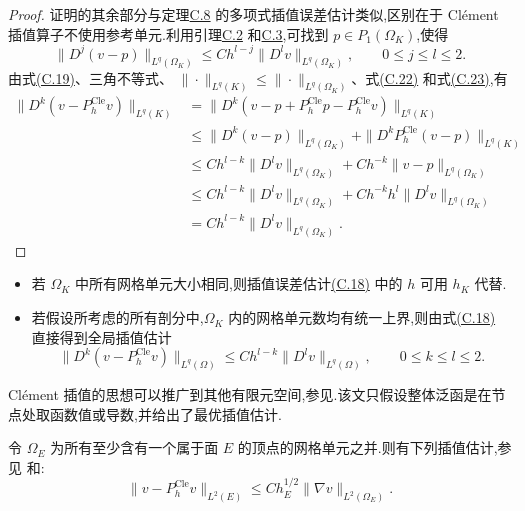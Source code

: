 \begin{proof}
证明的其余部分与定理\hyperref[thm:appendix-c-8]{C.8} 的多项式插值误差估计类似,区别在于 Clément 插值算子不使用参考单元.利用引理\hyperref[lem:appendix-c-2]{C.2} 和\hyperref[lem:appendix-c-3]{C.3},可找到 $p\in P_1(\Omega_K)$,使得
\begin{equation}\label{eq:appendix-c-23}
 \|D^j(v-p)\|_{L^q(\Omega_K)}
 \le Ch^{l-j}\|D^l v\|_{L^q(\Omega_K)},
 \qquad 0\le j\le l\le2.
\end{equation}
由式\hyperref[eq:appendix-c-19]{(C.19)}、三角不等式、
$\|\cdot\|_{L^q(K)}\le\|\cdot\|_{L^q(\Omega_K)}$、式\hyperref[eq:appendix-c-22]{(C.22)} 和式\hyperref[eq:appendix-c-23]{(C.23)},有
\[
\begin{aligned}
 \|D^k(v-P_h^{\mathrm{Cle}}v)\|_{L^q(K)}
 &=\|D^k(v-p+P_h^{\mathrm{Cle}}p-P_h^{\mathrm{Cle}}v)\|_{L^q(K)}\\
 &\le\|D^k(v-p)\|_{L^q(\Omega_K)}
   +\|D^kP_h^{\mathrm{Cle}}(v-p)\|_{L^q(K)}\\
 &\le Ch^{l-k}\|D^lv\|_{L^q(\Omega_K)}
   +Ch^{-k}\|v-p\|_{L^q(\Omega_K)}\\
 &\le Ch^{l-k}\|D^lv\|_{L^q(\Omega_K)}
   +Ch^{-k}h^l\|D^lv\|_{L^q(\Omega_K)}\\
 &=Ch^{l-k}\|D^lv\|_{L^q(\Omega_K)}.
\end{aligned}
\]
\end{proof}

\begin{note}[一致网格]\label{note:appendix-c-19}
\begin{itemize}
 \item 若 $\Omega_K$ 中所有网格单元大小相同,则插值误差估计\hyperref[eq:appendix-c-18]{(C.18)} 中的 $h$ 可用 $h_K$ 代替.
 \item 若假设所考虑的所有剖分中,$\Omega_K$ 内的网格单元数均有统一上界,则由式\hyperref[eq:appendix-c-18]{(C.18)} 直接得到全局插值估计
 \[
  \|D^k(v-P_h^{\mathrm{Cle}}v)\|_{L^q(\Omega)}
  \le Ch^{l-k}\|D^l v\|_{L^q(\Omega)},
  \qquad 0\le k\le l\le2.
 \]
\end{itemize}
\end{note}

\begin{note}[其他有限元空间]\label{note:appendix-c-20}
Clément 插值的思想可以推广到其他有限元空间,参见\textcite{Clement1975}.该文只假设整体泛函是在节点处取函数值或导数,并给出了最优插值估计.
\end{note}

\begin{note}[面上的估计]\label{note:appendix-c-21}
令 $\Omega_E$ 为所有至少含有一个属于面 $E$ 的顶点的网格单元之并.则有下列插值估计,参见\textcite{Clement1975} 和\textcite[引理 1.4]{TobiskaVerfuerth1996}:
\begin{equation}\label{eq:appendix-c-24}
 \|v-P_h^{\mathrm{Cle}}v\|_{L^2(E)}
 \le Ch_E^{1/2}\|\nabla v\|_{L^2(\Omega_E)}.
\end{equation}
\end{note}


